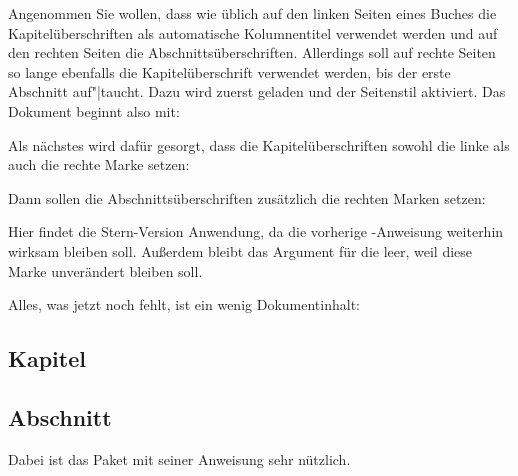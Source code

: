    \begin{Example}
      Angenommen Sie wollen, dass wie üblich auf den linken Seiten eines
      Buches die Kapitelüberschriften als automatische Kolumnentitel verwendet
      werden und auf den rechten Seiten die
      Abschnittsüberschriften. Allerdings soll auf rechte Seiten so lange
      ebenfalls die Kapitelüberschrift verwendet werden, bis der erste
      Abschnitt auf"|taucht. Dazu wird zuerst
       geladen und der Seitenstil 
      aktiviert. Das Dokument beginnt also mit:
      Als nächstes wird dafür gesorgt, dass die Kapitelüberschriften sowohl
      die linke als auch die rechte Marke setzen:
\begin{lstcode}
\end{lstcode}
      Dann sollen die Abschnittsüberschriften zusätzlich die rechten Marken
      setzen:
\begin{lstcode}
   \automark*[section]{}
\end{lstcode}
      Hier findet die Stern-Version Anwendung, da die vorherige
      -Anweisung weiterhin wirksam bleiben soll. Außerdem
      bleibt das Argument für die 
      leer, weil diese Marke unverändert bleiben soll.

      Alles, was jetzt noch fehlt, ist ein wenig Dokumentinhalt:
\begin{lstcode}
  \usepackage{lipsum}
  
  \chapter{Kapitel}
  \lipsum[1-20]
  \section{Abschnitt}
  \lipsum[21-40]
  
\end{lstcode}
      Dabei ist das Paket  mit seiner
      Anweisung  sehr nützlich. 


\end{Example}
